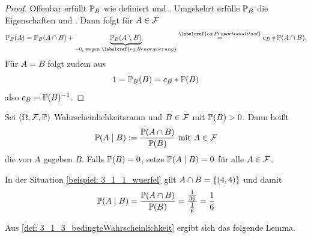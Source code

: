 \begin{proof}
	Offenbar erfüllt $\P_{B}$ wie definiert  und . Umgekehrt erfülle $\P_{B}$ die Eigenschaften  und . Dann folgt für $A \in \F$
	\begin{equation*}
		\P_B(A) = \P_{B}(A \cap B) + \underbrace{\P_{B}(A \setminus B)}_{= 0, \text{ wegen } \labelcref{eq: Renormierung}} \overset{\labelcref{eq: Proportionalitaet}}{=} c_B * \P(A \cap B).
	\end{equation*}
	Für $A=B$ folgt zudem aus 
	\begin{equation*}
		1 = \P_{B}(B) = c_B * \P(B)
	\end{equation*}
	also $c_B = \P(B)^{-1}$.
\end{proof}

%
\begin{definition} \label{def: 3_1_3_bedingteWahrscheinlichkeit}
	Sei $(\Omega, \F, \P)$ Wahrscheinlichkeitsraum und $B \in \F$ mit $\P(B) > 0$. Dann heißt
	\begin{equation*}
		\P(A \mid B) \defeq \frac{\P(A \cap B)}{\P(B)} \mit A \in \F
	\end{equation*}
	die  von $A$ gegeben $B$.
	Falls $\P(B) = 0$, setze $\P(A \mid B) = 0$ für alle $A \in \F$.
\end{definition}

\begin{beispiel} %
	In der Situation \cref{beispiel: 3_1_1_wuerfel} gilt $A \cap B = \menge{(4,4)}$ und damit
	\begin{equation*}
		\P(A \mid B) = \frac{\P(A \cap B)}{\P(B)} = \frac{\frac{1}{36}}{\frac{1}{6}} = \frac{1}{6}
	\end{equation*}
\end{beispiel}

Aus \cref{def: 3_1_3_bedingteWahrscheinlichkeit} ergibt sich das folgende Lemma.

